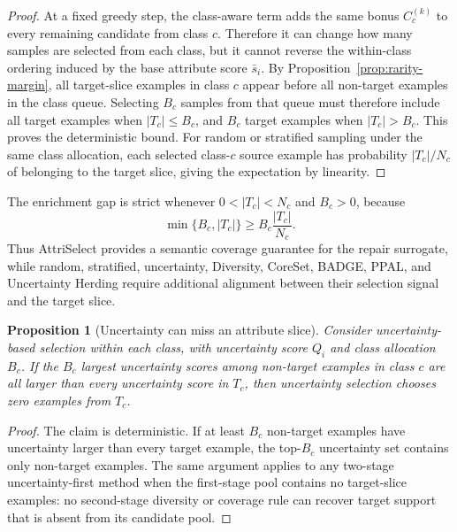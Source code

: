 \documentclass{article}
\newcommand{\model}{AttriSelect\xspace}
\newtheorem{proposition}{Proposition}
\begin{document}
\begin{proof}
At a fixed greedy step, the class-aware term adds the same bonus $C_c^{(k)}$ to every remaining candidate from class $c$. Therefore it can change how many samples are selected from each class, but it cannot reverse the within-class ordering induced by the base attribute score $\bar{s}_i$. By Proposition~\ref{prop:rarity-margin}, all target-slice examples in class $c$ appear before all non-target examples in the class queue. Selecting $B_c$ samples from that queue must therefore include all target examples when $|T_c|\leq B_c$, and $B_c$ target examples when $|T_c|>B_c$. This proves the deterministic bound. For random or stratified sampling under the same class allocation, each selected class-$c$ source example has probability $|T_c|/N_c$ of belonging to the target slice, giving the expectation by linearity.
\end{proof}

The enrichment gap is strict whenever $0<|T_c|<N_c$ and $B_c>0$, because
\begin{equation}
\label{eq:enrichment-gap}
\min\{B_c,|T_c|\}\geq B_c\frac{|T_c|}{N_c}.
\end{equation}
Thus \model provides a semantic coverage guarantee for the repair surrogate, while random, stratified, uncertainty, Diversity, CoreSet, BADGE, PPAL, and Uncertainty Herding require additional alignment between their selection signal and the target slice.

\begin{proposition}[Uncertainty can miss an attribute slice]
Consider uncertainty-based selection within each class, with uncertainty score $Q_i$ and class allocation $B_c$. If the $B_c$ largest uncertainty scores among non-target examples in class $c$ are all larger than every uncertainty score in $T_c$, then uncertainty selection chooses zero examples from $T_c$.
\end{proposition}

\begin{proof}
The claim is deterministic. If at least $B_c$ non-target examples have uncertainty larger than every target example, the top-$B_c$ uncertainty set contains only non-target examples. The same argument applies to any two-stage uncertainty-first method when the first-stage pool contains no target-slice examples: no second-stage diversity or coverage rule can recover target support that is absent from its candidate pool.
\end{proof}
\end{document}

